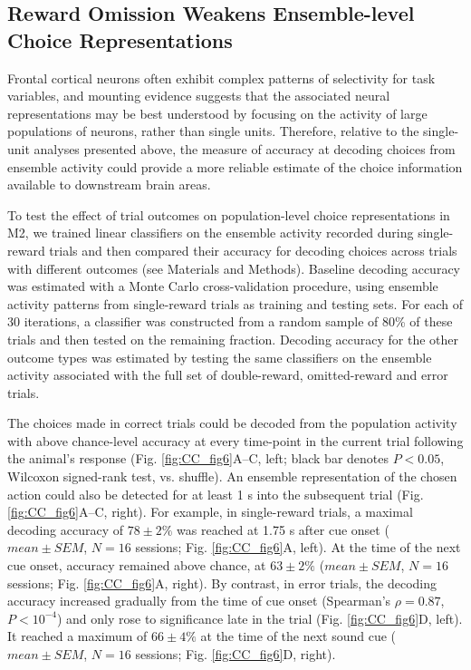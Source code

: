 \subsection[Effect of Outcome on Population Choice Representations]
{Reward Omission Weakens Ensemble-level Choice Representations}
Frontal cortical neurons often exhibit complex patterns of selectivity for task variables, and mounting evidence suggests that the associated neural representations may be best understood by focusing on the activity of large populations of neurons, rather than single units. Therefore, relative to the single-unit analyses presented above, the measure of accuracy at decoding choices from ensemble activity could provide a more reliable estimate of the choice information available to downstream brain areas.

To test the effect of trial outcomes on population-level choice representations in M2, we trained linear classifiers on the ensemble activity recorded during single-reward trials and then compared their accuracy for decoding choices across trials with different outcomes (see Materials and Methods). Baseline decoding accuracy was estimated with a Monte Carlo cross-validation procedure, using ensemble activity patterns from single-reward trials as training and testing sets. For each of 30 iterations, a classifier was constructed from a random sample of 80\% of these trials and then tested on the remaining fraction. Decoding accuracy for the other outcome types was estimated by testing the same classifiers on the ensemble activity associated with the full set of double-reward, omitted-reward and error trials.

The choices made in correct trials could be decoded from the population activity with above chance-level accuracy at every time-point in the current trial following the animal’s response (Fig. \ref{fig:CC_fig6}A–C, left; black bar denotes $P < 0.05$, Wilcoxon signed-rank test, vs. shuffle). An ensemble representation of the chosen action could also be detected for at least 1 s into the subsequent trial (Fig. \ref{fig:CC_fig6}A–C, right). For example, in single-reward trials, a maximal decoding accuracy of $78 \pm 2\%$ was reached at 1.75 s after cue onset ($mean \pm SEM$, $N = 16$ sessions; Fig. \ref{fig:CC_fig6}A, left). At the time of the next cue onset, accuracy remained above chance, at $63 \pm 2\%$ ($mean \pm SEM$, $N = 16$ sessions; Fig. \ref{fig:CC_fig6}A, right). By contrast, in error trials, the decoding accuracy increased gradually from the time of cue onset (Spearman's $\rho = 0.87$, $P < 10^{-4}$) and only rose to significance late in the trial (Fig. \ref{fig:CC_fig6}D, left). It reached a maximum of $66 \pm 4\%$ at the time of the next sound cue ($mean \pm SEM$, $N = 16$ sessions; Fig. \ref{fig:CC_fig6}D, right).

